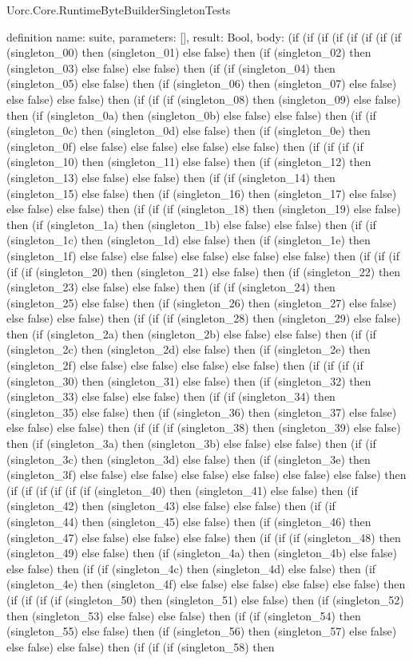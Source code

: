 \begin{lexlean}{Uorc.Core.RuntimeByteBuilderSingletonTests}
\begin{semanticmodule}
definition{
  name: suite,
  parameters: [],
  result: Bool,
  body: (if (if (if (if (if (if (if (if (singleton_00) then (singleton_01) else false) then (if (singleton_02) then (singleton_03) else false) else false) then (if (if (singleton_04) then (singleton_05) else false) then (if (singleton_06) then (singleton_07) else false) else false) else false) then (if (if (if (singleton_08) then (singleton_09) else false) then (if (singleton_0a) then (singleton_0b) else false) else false) then (if (if (singleton_0c) then (singleton_0d) else false) then (if (singleton_0e) then (singleton_0f) else false) else false) else false) else false) then (if (if (if (if (singleton_10) then (singleton_11) else false) then (if (singleton_12) then (singleton_13) else false) else false) then (if (if (singleton_14) then (singleton_15) else false) then (if (singleton_16) then (singleton_17) else false) else false) else false) then (if (if (if (singleton_18) then (singleton_19) else false) then (if (singleton_1a) then (singleton_1b) else false) else false) then (if (if (singleton_1c) then (singleton_1d) else false) then (if (singleton_1e) then (singleton_1f) else false) else false) else false) else false) else false) then (if (if (if (if (if (singleton_20) then (singleton_21) else false) then (if (singleton_22) then (singleton_23) else false) else false) then (if (if (singleton_24) then (singleton_25) else false) then (if (singleton_26) then (singleton_27) else false) else false) else false) then (if (if (if (singleton_28) then (singleton_29) else false) then (if (singleton_2a) then (singleton_2b) else false) else false) then (if (if (singleton_2c) then (singleton_2d) else false) then (if (singleton_2e) then (singleton_2f) else false) else false) else false) else false) then (if (if (if (if (singleton_30) then (singleton_31) else false) then (if (singleton_32) then (singleton_33) else false) else false) then (if (if (singleton_34) then (singleton_35) else false) then (if (singleton_36) then (singleton_37) else false) else false) else false) then (if (if (if (singleton_38) then (singleton_39) else false) then (if (singleton_3a) then (singleton_3b) else false) else false) then (if (if (singleton_3c) then (singleton_3d) else false) then (if (singleton_3e) then (singleton_3f) else false) else false) else false) else false) else false) else false) then (if (if (if (if (if (if (singleton_40) then (singleton_41) else false) then (if (singleton_42) then (singleton_43) else false) else false) then (if (if (singleton_44) then (singleton_45) else false) then (if (singleton_46) then (singleton_47) else false) else false) else false) then (if (if (if (singleton_48) then (singleton_49) else false) then (if (singleton_4a) then (singleton_4b) else false) else false) then (if (if (singleton_4c) then (singleton_4d) else false) then (if (singleton_4e) then (singleton_4f) else false) else false) else false) else false) then (if (if (if (if (singleton_50) then (singleton_51) else false) then (if (singleton_52) then (singleton_53) else false) else false) then (if (if (singleton_54) then (singleton_55) else false) then (if (singleton_56) then (singleton_57) else false) else false) else false) then (if (if (if (singleton_58) then }
\end{semanticmodule}
\end{lexlean}
